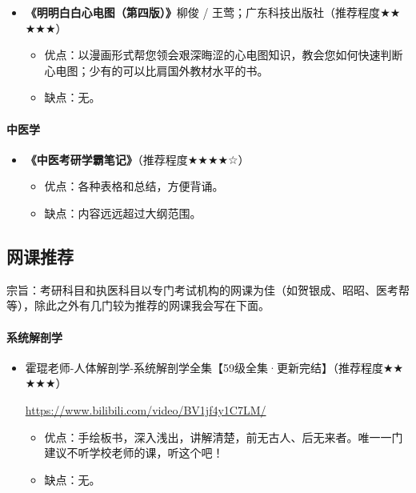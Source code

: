 \documentclass[zihao=-4,fontset=none]{Beautybook-CN}
\begin{document}
\begin{itemize}
	\item \textbf{《明明白白心电图（第四版）》}柳俊 / 王莺；广东科技出版社（推荐程度${\bigstar}$${\bigstar}$${\bigstar}$${\bigstar}$${\bigstar}$）
	      \begin{itemize}
	      	\item 优点：以漫画形式帮您领会艰深晦涩的心电图知识，教会您如何快速判断心电图；少有的可以比肩国外教材水平的书。
	      	\item 缺点：无。
	      \end{itemize}
	      	      
\end{itemize}
\paragraph{\textbf{中医学}}


\begin{itemize}
	\item \textbf{《中医考研学霸笔记》}（推荐程度${\bigstar}$${\bigstar}$${\bigstar}$${\bigstar}$☆）
	      \begin{itemize}
	      	\item 优点：各种表格和总结，方便背诵。
	      	\item 缺点：内容远远超过大纲范围。
	      \end{itemize}
	      	      
\end{itemize}
\subsection{网课推荐}

\begin{example}
	宗旨：考研科目和执医科目以专门考试机构的网课为佳（如贺银成、昭昭、医考帮等），除此之外有几门较为推荐的网课我会写在下面。
\end{example}

\paragraph{\textbf{系统解剖学}}


\begin{itemize}
	\item 霍琨老师-人体解剖学-系统解剖学全集【59级全集·更新完结】（推荐程度${\bigstar}$${\bigstar}$${\bigstar}$${\bigstar}$${\bigstar}$）
	      	      
	      \url{https://www.bilibili.com/video/BV1jf4y1C7LM/}
	      \begin{itemize}
	      	\item 优点：手绘板书，深入浅出，讲解清楚，前无古人、后无来者。唯一一门建议不听学校老师的课，听这个吧！
	      	\item 缺点：无。
	      \end{itemize}
	      	      
\end{itemize}
\end{document}
